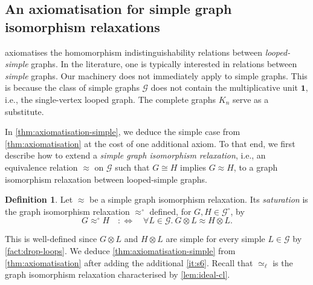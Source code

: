 \documentclass[11pt]{scrartcl}
\theoremstyle{definition}
\newtheorem{definition}{Definition}[section]
\theoremstyle{plain}
\theoremstyle{remark}
\newcommand{\lG}{\mathcal{G}^\circ}
\newcommand{\G}{\mathcal{G}}
\newcommand{\defiff}{:\!\!\iff}
\begin{document}
	\subsection{An axiomatisation for simple graph isomorphism relaxations}
	\label{sec:simple-axiomatisation}


	 axiomatises the homomorphism indistinguishability relations between \emph{looped-simple} graphs.
	In the literature, one is typically interested in relations between \emph{simple} graphs.
	Our machinery does not immediately apply to simple graphs.
	This is because the class of simple graphs $\G$ does not contain the multiplicative unit $\boldsymbol{1}$, i.e., the single-vertex looped graph.
	The complete graphs $K_n$ serve as a substitute.


	In \cref{thm:axiomatisation-simple}, we deduce the simple case from \cref{thm:axiomatisation} at the cost of one additional axiom.
	To that end, we first describe how to extend a \emph{simple graph isomorphism relaxation}, i.e., an equivalence relation $\approx$ on $\G$ such that $G \cong H$ implies $G \approx H$, to a graph isomorphism relaxation between looped-simple graphs.

	\begin{definition}\label{def:circ-extension}
		Let $\approx$ be a simple graph isomorphism relaxation.
		Its \emph{saturation} is the graph isomorphism relaxation $\approx^\circ$ defined,
		for $G, H \in \lG$, by
		\[
			G \approx^\circ H
			\quad \defiff \quad
			\forall L \in \G.\ G \otimes L \approx H \otimes L.
		\]
	\end{definition}

	This is well-defined since $G \otimes L$ and $H \otimes L$ are simple for every simple $L \in \G$ by \cref{fact:drop-loops}.
	We deduce \cref{thm:axiomatisation-simple} from \cref{thm:axiomatisation} after adding the additional \cref{it:s6}.
	Recall that $\simeq_\ell$ is the graph isomorphism relaxation characterised by \cref{lem:ideal-cl}. 
	

	

	\thmAxiomSimp*
\end{document}
